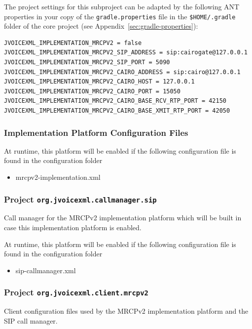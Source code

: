 \documentclass[11pt,a4paper]{article}
\begin{document}
The project settings for this subproject can be adapted by the following ANT
properties in your copy of the \texttt{gradle.properties} file in the
\texttt{\${HOME}/.gradle} folder of the core project (see 
Appendix~\ref{sec:gradle-properties}):
\begin{lstlisting}
JVOICEXML_IMPLEMENTATION_MRCPV2 = false
JVOICEXML_IMPLEMENTATION_MRCPV2_SIP_ADDRESS = sip:cairogate@127.0.0.1
JVOICEXML_IMPLEMENTATION_MRCPV2_SIP_PORT = 5090
JVOICEXML_IMPLEMENTATION_MRCPV2_CAIRO_ADDRESS = sip:cairo@127.0.0.1
JVOICEXML_IMPLEMENTATION_MRCPV2_CAIRO_HOST = 127.0.0.1
JVOICEXML_IMPLEMENTATION_MRCPV2_CAIRO_PORT = 15050
JVOICEXML_IMPLEMENTATION_MRCPV2_CAIRO_BASE_RCV_RTP_PORT = 42150
JVOICEXML_IMPLEMENTATION_MRCPV2_CAIRO_BASE_XMIT_RTP_PORT = 42050
\end{lstlisting}

\subsubsection{Implementation Platform Configuration Files}

At runtime, this platform will be enabled if the following configuration file is found in the configuration
folder
\begin{itemize}
\item mrcpv2-implementation.xml
\end{itemize}

\subsubsection{Project \texttt{org.jvoicexml.callmanager.sip}}

Call manager for the MRCPv2 implementation platform which will be built in case this implementation platform is enabled.


At runtime, this platform will be enabled if the following configuration file is found in the configuration
folder
\begin{itemize}
\item sip-callmanager.xml
\end{itemize}
 
\subsubsection{Project \texttt{org.jvoicexml.client.mrcpv2}}

Client configuration files used by the MRCPv2 implementation platform and the SIP call manager.
\end{document}
